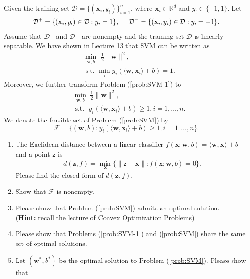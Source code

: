 \documentclass[11pt,letter,notitlepage]{article}
\begin{document}
\begin{exercise}
Given the training set $\mathcal{D}=\{ (\textbf{x}_i,y_i) \}_{i=1}^n$, where $\textbf{x}_i \in \mathbb{R}^d$ and $y_i \in \{ -1,1 \}$. Let
\begin{align*}
    \mathcal{D}^+=\{(\textbf{x}_i,y_i)\in\mathcal{D}:y_i=1\},\hspace{5mm}\mathcal{D}^-=\{(\textbf{x}_i,y_i)\in\mathcal{D}:y_i=-1\}.
\end{align*}
Assume that $\mathcal{D}^+$ and $\mathcal{D}^-$ are nonempty and the training set $\mathcal{D}$ is linearly separable. We have shown in Lecture 13 that SVM can be written as
\begin{align}\label{prob:SVM-1}
	&\min_{\textbf{w},b}\,\,\frac{1}{2}\| \textbf{w} \|^2, \\
	&\text{ s.t. } \min_i y_{i} ( \langle \textbf{w}, \textbf{x}_i \rangle + b ) = 1. \nonumber
\end{align}
Moreover, we further transform Problem (\ref{prob:SVM-1}) to
\begin{align}\label{prob:SVM}
    	&\min_{\textbf{w},b}\,\,\frac{1}{2}\| \textbf{w} \|^2, \\
    	&\text{ s.t. }\,\, y_{i} ( \langle \textbf{w}, \textbf{x}_i \rangle + b ) \geq 1, i=1,\ldots,n. \nonumber
\end{align}
We denote the feasible set of Problem (\ref{prob:SVM}) by $$\mathcal{F}=\{(\mathbf{w},b):y_{i} ( \langle \textbf{w}, \textbf{x}_i \rangle + b ) \geq 1, i=1,\ldots,n\}.$$

\begin{enumerate}
    \item The Euclidean distance between a linear classifier $f(\mathbf{x};\mathbf{w},b)=\langle\mathbf{w},\mathbf{x}\rangle+b$ and a point $\mathbf{z}$ is
    \begin{align*}
        d(\mathbf{z},f)=\min_{\mathbf{x}}\{\|\mathbf{z}-\mathbf{x} \|:f(\mathbf{x};\mathbf{w},b)=0\}.
    \end{align*}
    Please find the closed form of $d(\mathbf{z},f)$.
    \item Show that $\mathcal{F}$ is nonempty.
    \item Please show that Problem (\ref{prob:SVM}) admits an optimal solution.\\ (\textbf{Hint:} recall the lecture of Convex Optimization Problems)
    \item Please show that Problems (\ref{prob:SVM-1}) and (\ref{prob:SVM}) share the same set of optimal solutions.
    \item Let $(\textbf{w}^*,b^*)$ be the optimal solution to Problem (\ref{prob:SVM}). Please show that 
    

\end{enumerate}
\end{exercise}
\end{document}
